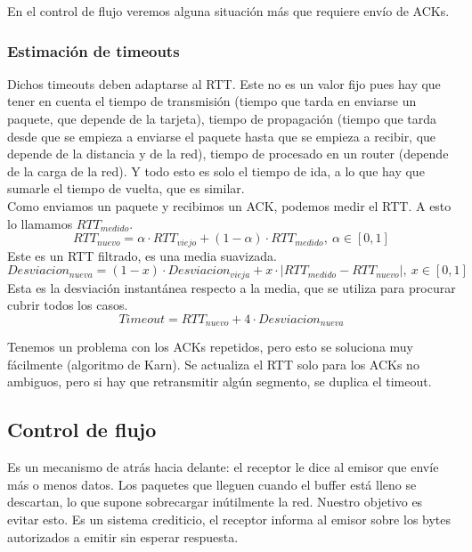 En el control de flujo veremos alguna situación más que requiere envío de ACKs. 

\subsubsection{Estimación de timeouts}
Dichos timeouts deben adaptarse al \acrlong{RTT}. Este no es un valor fijo pues hay que tener en cuenta el tiempo de transmisión (tiempo que tarda en enviarse un paquete, que depende de la tarjeta), tiempo de propagación (tiempo que tarda desde que se empieza a enviarse el paquete hasta que se empieza a recibir, que depende de la distancia y de la red), tiempo de procesado en un router (depende de la carga de la red). Y todo esto es solo el tiempo de ida, a lo que hay que sumarle el tiempo de vuelta, que es similar. \\

Como enviamos un paquete y recibimos un ACK, podemos medir el \acrshort{RTT}. A esto lo llamamos $RTT_{medido}$. 
\begin{equation*}
    RTT_{nuevo} = \alpha\cdot RTT_{viejo} + (1-\alpha)\cdot RTT_{medido}, \ \alpha \in [0,1]
\end{equation*}
Este es un RTT filtrado, es una media suavizada. 
\begin{equation*}
    Desviacion_{nueva} = (1-x)\cdot Desviacion_{vieja} + x\cdot |RTT_{medido}-RTT_{nuevo}|, \ x \in [0,1]
\end{equation*}
Esta es la desviación instantánea respecto a la media, que se utiliza para procurar cubrir todos los casos. 
\begin{equation*}
    Timeout = RTT_{nuevo} + 4\cdot Desviacion_{nueva}
\end{equation*}

Tenemos un problema con los ACKs repetidos, pero esto se soluciona muy fácilmente (algoritmo de Karn). Se actualiza el RTT solo para los ACKs no ambiguos, pero si hay que retransmitir algún segmento, se duplica el timeout. 

\subsection{Control de flujo}
Es un mecanismo de atrás hacia delante: el receptor le dice al emisor que envíe más o menos datos. Los paquetes que lleguen cuando el buffer está lleno se descartan, lo que supone sobrecargar inútilmente la red. Nuestro objetivo es evitar esto. Es un sistema crediticio, el receptor informa al emisor sobre los bytes autorizados a emitir sin esperar respuesta. \\

